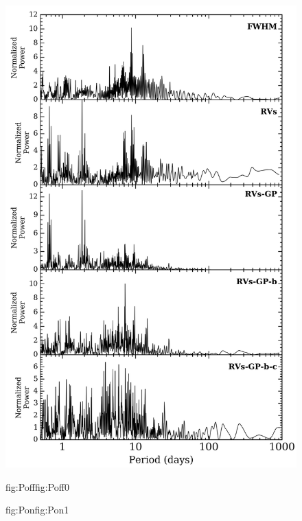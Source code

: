 \begin{figure}
  \centering
  \includegraphics[width=0.8\hsize]{figures/periodograms_bkgd.png}%
  \hspace{-0.8\hsize}%
  \begin{ocg}{fig:Poff}{fig:Poff}{0}%
  \end{ocg}%
  \begin{ocg}{fig:Pon}{fig:Pon}{1}%

\end{ocg}
\end{figure}
